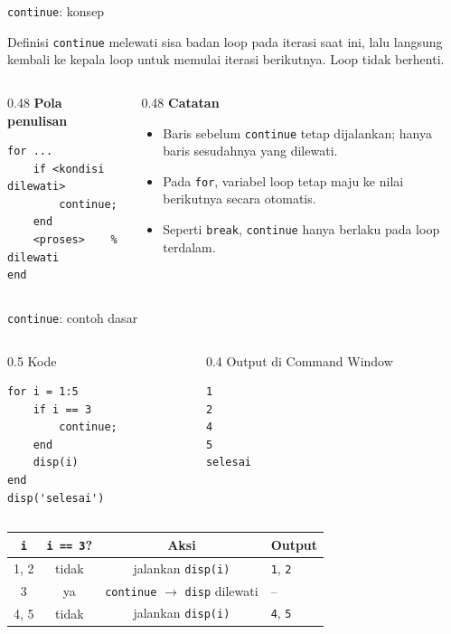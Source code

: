 \documentclass[aspectratio=169,10pt]{beamer}
\newcommand{\kode}[1]{\texttt{#1}}
\newcommand{\labelkode}{{\scriptsize\color{black!60}Kode}}
\newcommand{\labelout}{{\scriptsize\color{alertc}Output di Command Window}}
\begin{document}
\begin{frame}[fragile]{\kode{continue}: konsep}
  \begin{block}{Definisi}
    \kode{continue} melewati \alert{sisa badan loop} pada iterasi saat ini, lalu langsung kembali ke kepala
    loop untuk memulai \alert{iterasi berikutnya}. Loop \alert{tidak} berhenti.
  \end{block}
  \vspace{4pt}
  \begin{columns}[T]
    \begin{column}{0.48\textwidth}
      \textbf{Pola penulisan}
\begin{lstlisting}
for ...
    if <kondisi dilewati>
        continue;
    end
    <proses>    % dilewati
end
\end{lstlisting}
    \end{column}
    \begin{column}{0.48\textwidth}
      \textbf{Catatan}
      \begin{itemize}
        \item Baris \alert{sebelum} \kode{continue} tetap dijalankan; hanya baris \alert{sesudahnya} yang dilewati.
        \item Pada \kode{for}, variabel loop tetap maju ke nilai berikutnya secara otomatis.
        \item Seperti \kode{break}, \kode{continue} hanya berlaku pada loop terdalam.
      \end{itemize}
    \end{column}
  \end{columns}
\end{frame}

\begin{frame}[fragile]{\kode{continue}: contoh dasar}
  \begin{columns}[T]
    \begin{column}{0.5\textwidth}
      \labelkode
\begin{lstlisting}
for i = 1:5
    if i == 3
        continue;
    end
    disp(i)
end
disp('selesai')
\end{lstlisting}
    \end{column}
    \begin{column}{0.4\textwidth}
      \labelout
\begin{lstlisting}[style=out]
1
2
4
5
selesai
\end{lstlisting}
    \end{column}
  \end{columns}
  \vspace{6pt}
  \centering
  \begin{tabular}{@{}cccl@{}}
    \toprule
    \kode{i} & \kode{i == 3}? & Aksi & Output \\
    \midrule
    1, 2 & tidak & jalankan \kode{disp(i)} & \kode{1}, \kode{2} \\
    3 & \alert{ya} & \alert{\kode{continue}} $\rightarrow$ \kode{disp} dilewati & -- \\
    4, 5 & tidak & jalankan \kode{disp(i)} & \kode{4}, \kode{5} \\
    \bottomrule
  \end{tabular}
\end{frame}
\end{document}
